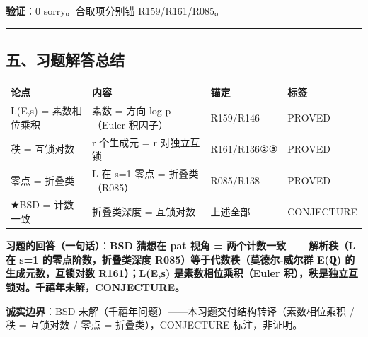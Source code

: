 \documentclass[
]{article}
\newcounter{none} %
\begin{document}
\textbf{验证}：0 sorry。合取项分别锚 R159/R161/R085。

\begin{center}\rule{0.5\linewidth}{0.5pt}\end{center}

\subsection{五、习题解答总结}\label{ux4e94ux4e60ux9898ux89e3ux7b54ux603bux7ed3}

{\def\LTcaptype{none} %
\begin{longtable}[]{@{}
 >{\raggedright\arraybackslash}p{}
 >{\raggedright\arraybackslash}p{}
 >{\raggedright\arraybackslash}p{}
 >{\raggedright\arraybackslash}p{}@{}}
\toprule\noalign{}
\begin{minipage}[b]{\linewidth}\raggedright
论点
\end{minipage} & \begin{minipage}[b]{\linewidth}\raggedright
内容
\end{minipage} & \begin{minipage}[b]{\linewidth}\raggedright
锚定
\end{minipage} & \begin{minipage}[b]{\linewidth}\raggedright
标签
\end{minipage} \\
\midrule\noalign{}
\endhead
\bottomrule\noalign{}
\endlastfoot
L(E,s) = 素数相位乘积 & 素数 = 方向 log p（Euler 积因子） & R159/R146 &
PROVED \\
秩 = 互锁对数 & r 个生成元 = r 对独立互锁 & R161/R136②③ & PROVED \\
零点 = 折叠类 & L 在 s=1 零点 = 折叠类（R085） & R085/R138 & PROVED \\
★BSD = 计数一致 & 折叠类深度 = 互锁对数 & 上述全部 & CONJECTURE \\
\end{longtable}
}

\textbf{习题的回答（一句话）}：\textbf{BSD 猜想在 pat 视角 =
两个计数一致------解析秩（L 在 s=1 的零点阶数，折叠类深度
R085）等于代数秩（莫德尔-威尔群 E(ℚ) 的生成元数，互锁对数 R161）；L(E,s)
是素数相位乘积（Euler 积），秩是独立互锁对。千禧年未解，CONJECTURE。}

\textbf{诚实边界}：BSD
未解（千禧年问题）------本习题交付结构转译（素数相位乘积 / 秩 = 互锁对数
/ 零点 = 折叠类），CONJECTURE 标注，非证明。
\end{document}
